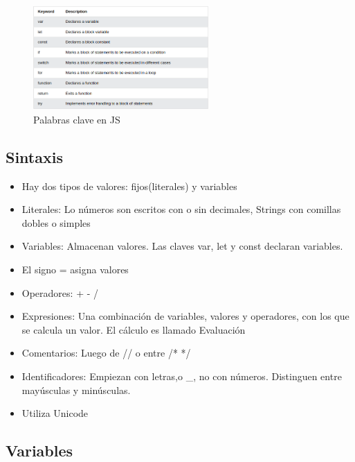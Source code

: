 \documentclass{article}
\begin{document}
 \begin{figure}[H]
   \centering
   \includegraphics[width=0.6\textwidth]{img/table1.png}
   \caption{Palabras clave en JS}
 \end{figure}

 \subsection{Sintaxis}

 \begin{itemize}
   \item Hay dos tipos de valores: fijos(literales) y variables
   \item  Literales: Lo números son escritos con o sin decimales, Strings con comillas dobles o simples
   \item Variables: Almacenan valores. Las claves var, let y const declaran variables.
   \item El signo = asigna valores
   \item Operadores: + -  /
   \item Expresiones: Una combinación de variables, valores y operadores, con los que se calcula un valor. El cálculo es llamado Evaluación
   \item Comentarios: Luego de // o entre /* */
   \item Identificadores: Empiezan con letras,\textdollar o \_, no con números. Distinguen entre mayúsculas y minúsculas.
   \item Utiliza Unicode
 \end{itemize}

 \subsection{Variables}
\end{document}
